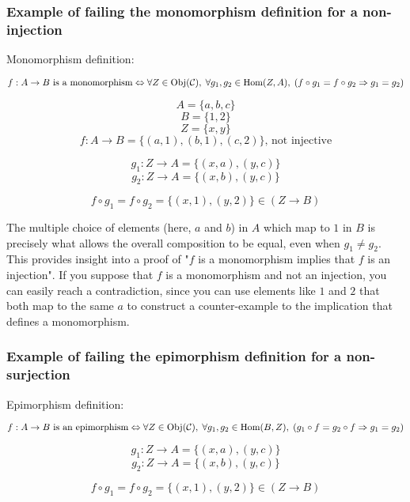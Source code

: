 \documentclass[12pt, letterpaper, twoside]{report}
\begin{document}
\subsubsection*{Example of failing the monomorphism definition for a non-injection}

Monomorphism definition:

$$
\text{$f : A \to B$ is a monomorphism}
\\ \Leftrightarrow \\
\forall Z \in \text{Obj}(\mathcal{C}), \;
\forall g_1, g_2 \in \text{Hom}(Z, A), \;
(f \circ g_1 = f \circ g_2 \Rightarrow g_1 = g_2)
$$



$$A = \{ a, b, c \}$$
$$B = \{ 1, 2    \}$$
$$Z = \{ x, y    \}$$
$$f : A \to B = \{ (a, 1), (b, 1), (c, 2) \} \text{, not injective}$$

$$g_1 : Z \to A = \{ (x, a), (y, c) \}$$
$$g_2 : Z \to A = \{ (x, b), (y, c) \}$$

$$f \circ g_1 = f \circ g_2 = \{(x, 1), (y, 2)\} \in (Z \to B)$$

The multiple choice of elements (here, $a$ and $b$) in $A$ which map to $1$ in $B$ is precisely what allows the overall composition to be equal, even when $g_1 \neq g_2$. This provides insight into a proof of "$f$ is a monomorphism implies that $f$ is an injection". If you suppose that $f$ is a monomorphism and not an injection, you can easily reach a contradiction, since you can use elements like $1$ and $2$ that both map to the same $a$ to construct a counter-example to the implication that defines a monomorphism.



\subsubsection*{Example of failing the epimorphism definition for a non-surjection}

Epimorphism definition:

$$
\text{$f : A \to B$ is an epimorphism}
\\ \Leftrightarrow \\ 
\forall Z \in \text{Obj}(\mathcal{C}), \;
\forall g_1, g_2 \in \text{Hom}(B, Z), \;
(g_1 \circ f = g_2 \circ f \Rightarrow g_1 = g_2)
$$



$$g_1 : Z \to A = \{ (x, a), (y, c) \}$$
$$g_2 : Z \to A = \{ (x, b), (y, c) \}$$

$$f \circ g_1 = f \circ g_2 = \{(x, 1), (y, 2)\} \in (Z \to B)$$
\end{document}
